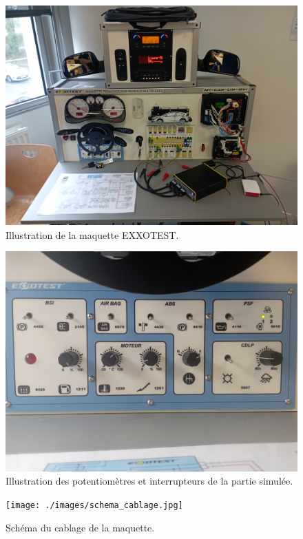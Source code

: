 \documentclass{rapportECC}
\begin{document}
\begin{figure}[H]
    \centering
    \includegraphics[width=.7\textwidth]{./images/maquette.jpg}
    \caption{Illustration de la maquette EXXOTEST.}
    \label{fig:maquette_EXXOTEST}
\end{figure}

\begin{figure}[H]
    \centering
    \includegraphics[width=.7\textwidth]{./images/potentiometres_simu.jpg}
    \caption{Illustration des potentiomètres et interrupteurs de la partie simulée.}
    \label{fig:potentiometres}
\end{figure}

\begin{figure}[H]
    \centering
    \texttt{[image: ./images/schema\_cablage.jpg]}
    \caption{Schéma du cablage de la maquette.}
    \label{fig:schema_cablage}
\end{figure}
\end{document}
